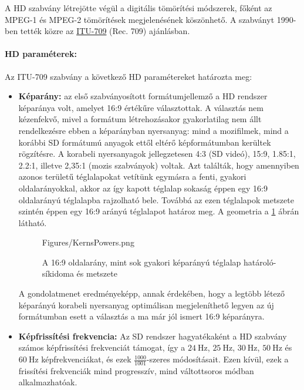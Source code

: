A HD szabvány létrejötte végül a digitális tömörítési módszerek, főként az MPEG-1 és MPEG-2 tömörítések megjelenésének köszönhető.
A szabványt 1990-ben tették közre az \href{https://www.itu.int/dms_pubrec/itu-r/rec/bt/R-REC-BT.709-6-201506-I!!PDF-E.pdf}{ITU-709} (Rec. 709) ajánlásban.

\paragraph{HD paraméterek:\\}

Az ITU-709 szabvány a következő HD paramétereket határozta meg:
\begin{itemize}
\item \textbf{Képarány:} az első szabványosított formátumjellemző a HD rendszer képaránya volt, amelyet 16:9 értékűre választottak.
A választás nem kézenfekvő, mivel a formátum létrehozásakor gyakorlatilag nem állt rendelkezésre ebben a képarányban nyersanyag: mind a mozifilmek, mind a korábbi SD formátumú anyagok ettől eltérő képformátumban kerültek rögzítésre.
A korabeli nyersanyagok jellegzetesen 4:3 (SD videó), 15:9, 1.85:1, 2.2:1, illetve 2,35:1 (mozis szabványok) voltak.
Azt találták, hogy amennyiben azonos területű téglalapokat vetítünk egymásra a fenti, gyakori oldalarányokkal, akkor az így kapott téglalap sokaság éppen egy 16:9 oldalarányú téglalapba rajzolható bele.
Továbbá az ezen téglalapok metszete szintén éppen egy 16:9 arányú téglalapot határoz meg.
A geometria a \ref{Fig:kerns_powers} ábrán látható.
\begin{figure}[]
	\centering
	\begin{overpic}[width = 0.9 \columnwidth ]{Figures/KernsPowers.png}
	\small
	\end{overpic}
	\caption{A 16:9 oldalarány, mint sok gyakori képarányú téglalap határoló-síkidoma és metszete}
	\label{Fig:kerns_powers}
\end{figure}
A gondolatmenet eredményeképp, annak érdekében, hogy a legtöbb létező képarányú korabeli nyersanyag optimálisan megjeleníthető legyen az új formátumban esett a választás a ma már jól ismert 16:9 képarányra.

\item \textbf{Képfrissítési frekvencia:} Az SD rendszer hagyatékaként a HD szabvány számos képfrissítési frekvenciát támogat, így a $24~\mathrm{Hz}$, $25~\mathrm{Hz}$, $30~\mathrm{Hz}$, $50~\mathrm{Hz}$ és $60~\mathrm{Hz}$ képfrekvenciákat, és ezek $\frac{1000}{1001}$-szeres módosításait.
Ezen kívül, ezek a frissítési frekvenciák mind progresszív, mind váltottsoros módban alkalmazhatóak.


\end{itemize}
